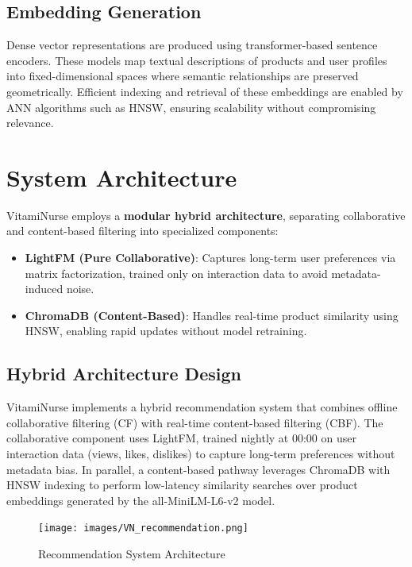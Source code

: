 \subsection{Embedding Generation}
Dense vector representations are produced using transformer-based sentence encoders. These models map textual descriptions of products and
user profiles into fixed-dimensional spaces where semantic relationships
are preserved geometrically. Efficient indexing and retrieval of these
embeddings are enabled by ANN algorithms such as HNSW, ensuring
scalability without compromising relevance.


\section{System Architecture}
VitamiNurse employs a \textbf{modular hybrid architecture}, separating collaborative and content-based filtering into specialized components:
\begin{itemize}
    \item \textbf{LightFM (Pure Collaborative)}: Captures long-term user preferences via matrix factorization, trained only on interaction data to avoid metadata-induced noise.
    \item \textbf{ChromaDB (Content-Based)}: Handles real-time product similarity using HNSW, enabling rapid updates without model retraining.
\end{itemize}

\subsection{Hybrid Architecture Design}

VitamiNurse implements a hybrid recommendation system that combines
offline collaborative filtering (CF) with real-time content-based filtering (CBF). The collaborative component uses LightFM, trained
nightly at 00:00 on user interaction data (views, likes, dislikes) to capture
long-term preferences without metadata bias. In parallel, a content-based pathway leverages ChromaDB with HNSW indexing to perform
low-latency similarity searches over product embeddings generated by
the all-MiniLM-L6-v2 model.

\begin{center}
\begin{figure}[H]
    \texttt{[image: images/VN\_recommendation.png]}
    \caption{Recommendation System Architecture } 
    \label{fig:Recommendation Sequence Diagram }
\end{figure}
\end{center}


